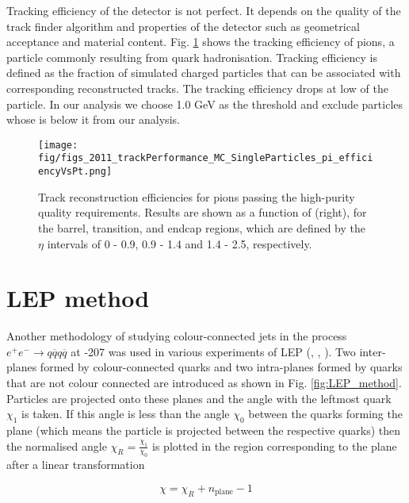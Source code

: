 Tracking efficiency of the detector is not perfect. It depends on the quality of the track finder algorithm and properties of the detector such as geometrical acceptance and material content. Fig. \ref{fig:2011_trackPerformance_MC_SingleParticles_pi_efficiencyVsPt}  shows the tracking efficiency of pions, a particle commonly resulting from quark hadronisation. Tracking efficiency is defined as the fraction of simulated charged particles that can be associated with corresponding reconstructed tracks. The tracking efficiency drops at low \pt of the particle. In our analysis we choose 1.0 GeV as the threshold and exclude particles whose \pt is below it from our analysis.

\begin{figure}[hbtp]
    \texttt{[image: fig/figs\_2011\_trackPerformance\_MC\_SingleParticles\_pi\_efficiencyVsPt.png]}
    \caption{Track reconstruction efficiencies for pions passing the high-purity quality requirements. Results are shown as a function of \pt (right), for the barrel, transition, and endcap regions, which are defined by the $\eta$ intervals of 0 - 0.9, 0.9 - 1.4 and 1.4 - 2.5, respectively. \cite{Chatrchyan:2014fea}}
    \label{fig:2011_trackPerformance_MC_SingleParticles_pi_efficiencyVsPt}
\end{figure}

\section{LEP method}

Another methodology of studying colour-connected jets in the process $e^{+}e^{-}\rightarrow q\overline{q}q\overline{q}$ at -207 \GeV was used in various experiments of LEP (\cite{Abdallah:2006uq}, \cite{Abbiendi:2005es}, \cite{Achard:2003pe}). Two inter-\PW planes formed by colour-connected quarks and two intra-\PW planes formed by quarks that are not colour connected are introduced as shown in Fig. \ref{fig:LEP_method}. Particles are projected onto these planes and the angle with the leftmost quark $\chi_{1}$ is taken. If this angle is less than the angle $\chi_{0}$ between the quarks forming the plane (which means the particle is projected between the respective quarks) then the normalised angle $\chi_{R}=\frac{\chi_{1}}{\chi_{0}}$ is plotted in the region corresponding to the plane after a linear transformation

\begin{equation}
  \chi=\chi_{R} + n_{\text{plane}} - 1
\end{equation}

